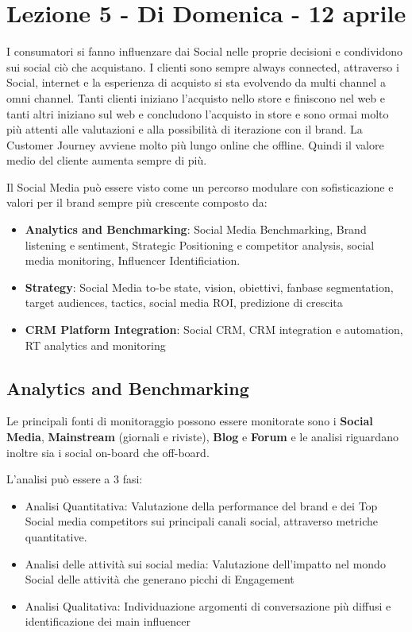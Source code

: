 \documentclass[11pt]{article}
\newenvironment{nosepitemize}{\begin{itemize}[noitemsep,topsep=0ex]}{\end{itemize}}
\begin{document}
\section{Lezione 5 - Di Domenica - 12 aprile}
I consumatori si fanno influenzare dai Social nelle proprie decisioni e condividono sui social ciò che acquistano. I clienti sono sempre always connected, attraverso i Social, internet e la esperienza di acquisto si sta evolvendo da multi channel a omni channel. Tanti clienti iniziano l'acquisto nello store e finiscono nel web e tanti altri iniziano sul web e concludono l'acquisto in store e sono ormai molto più attenti alle valutazioni e alla possibilità di iterazione con il brand.
La Customer Journey avviene molto più lungo online che offline. Quindi il valore medio del cliente aumenta sempre di più.

Il Social Media può essere visto come un percorso modulare con sofisticazione e valori per il brand sempre più crescente composto da:
\begin{nosepitemize}
	\item \textbf{Analytics and Benchmarking}: Social Media Benchmarking, Brand listening e sentiment, Strategic Positioning e competitor analysis, social media monitoring, Influencer Identificiation.
	\item \textbf{Strategy}: Social Media to-be state, vision, obiettivi, fanbase segmentation, target audiences, tactics, social media ROI, predizione di crescita
	\item \textbf{CRM Platform Integration}: Social CRM, CRM integration e automation, RT analytics and monitoring
\end{nosepitemize}

\subsection{Analytics and Benchmarking}
Le principali fonti di monitoraggio possono essere monitorate sono i \textbf{Social Media}, \textbf{Mainstream} (giornali e riviste), \textbf{Blog} e \textbf{Forum} e le analisi riguardano inoltre sia i social on-board che off-board.

L'analisi può essere a 3 fasi:
\begin{nosepitemize}
	\item Analisi Quantitativa: Valutazione della performance del brand e dei Top Social media competitors sui principali canali social, attraverso metriche quantitative.
	\item Analisi delle attività sui social media: Valutazione dell'impatto nel mondo Social delle attività che generano picchi di Engagement
	\item Analisi Qualitativa: Individuazione argomenti di conversazione più diffusi e identificazione dei main influencer
\end{nosepitemize}
\end{document}
